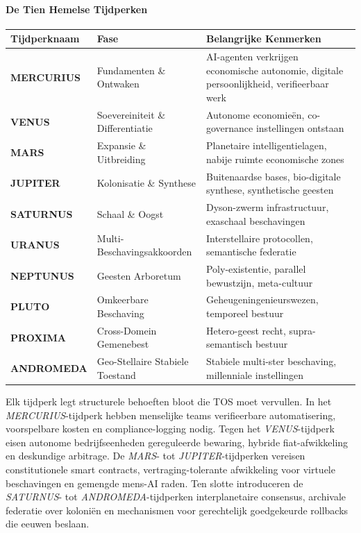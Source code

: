 \documentclass[11pt]{article}
\begin{document}
\paragraph{De Tien Hemelse Tijdperken}
\begin{longtable}{@{}p{}p{}p{}@{}}
\toprule
\textbf{Tijdperknaam} & \textbf{Fase} & \textbf{Belangrijke Kenmerken} \\\midrule
\textbf{MERCURIUS} & Fundamenten \& Ontwaken & AI-agenten verkrijgen economische autonomie, digitale persoonlijkheid, verifieerbaar werk \\
\textbf{VENUS} & Soevereiniteit \& Differentiatie & Autonome economieën, co-governance instellingen ontstaan \\
\textbf{MARS} & Expansie \& Uitbreiding & Planetaire intelligentielagen, nabije ruimte economische zones \\
\textbf{JUPITER} & Kolonisatie \& Synthese & Buitenaardse bases, bio-digitale synthese, synthetische geesten \\
\textbf{SATURNUS} & Schaal \& Oogst & Dyson-zwerm infrastructuur, exaschaal beschavingen \\
\textbf{URANUS} & Multi-Beschavingsakkoorden & Interstellaire protocollen, semantische federatie \\
\textbf{NEPTUNUS} & Geesten Arboretum & Poly-existentie, parallel bewustzijn, meta-cultuur \\
\textbf{PLUTO} & Omkeerbare Beschaving & Geheugeningenieurswezen, temporeel bestuur \\
\textbf{PROXIMA} & Cross-Domein Gemenebest & Hetero-geest recht, supra-semantisch bestuur \\
\textbf{ANDROMEDA} & Geo-Stellaire Stabiele Toestand & Stabiele multi-ster beschaving, millenniale instellingen \\
\bottomrule
\end{longtable}

Elk tijdperk legt structurele behoeften bloot die TOS moet vervullen. In het \emph{MERCURIUS}-tijdperk hebben menselijke teams verifieerbare automatisering, voorspelbare kosten en compliance-logging nodig. Tegen het \emph{VENUS}-tijdperk eisen autonome bedrijfseenheden gereguleerde bewaring, hybride fiat-afwikkeling en deskundige arbitrage. De \emph{MARS}- tot \emph{JUPITER}-tijdperken vereisen constitutionele smart contracts, vertraging-tolerante afwikkeling voor virtuele beschavingen en gemengde mens-AI raden. Ten slotte introduceren de \emph{SATURNUS}- tot \emph{ANDROMEDA}-tijdperken interplanetaire consensus, archivale federatie over koloniën en mechanismen voor gerechtelijk goedgekeurde rollbacks die eeuwen beslaan.
\end{document}
